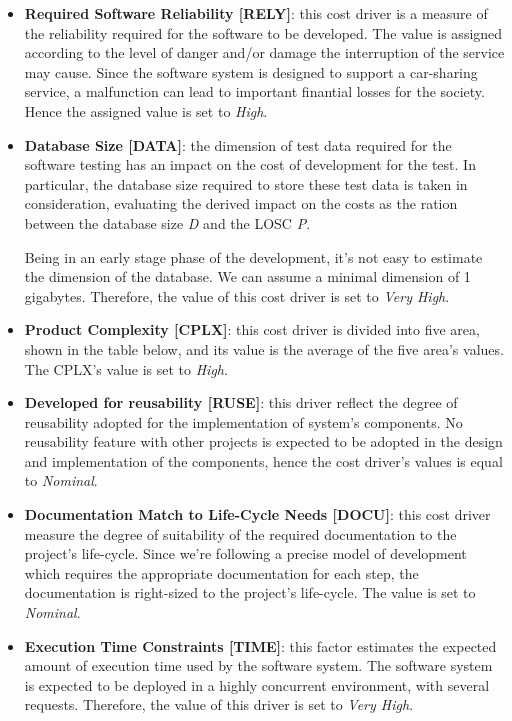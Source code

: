 \begin{itemize}
	\item \textbf{Required Software Reliability [RELY]}: this cost driver is a measure of the reliability required for the software to be developed. The value is assigned according to the level of danger and/or damage the interruption of the service may cause.
Since the software system is designed to support a car-sharing service, a malfunction can lead to important finantial losses for the society. Hence the assigned value is set to \textit{High}.

	\item \textbf{Database Size [DATA]}: the dimension of test data required for the software testing has an impact on the cost of development for the test. In particular, the database size required to store these test data is taken in consideration, evaluating the derived impact on the costs as the ration between the database size \textit{D} and the LOSC \textit{P}.

Being in an early stage phase of the development, it's not easy to estimate the dimension of the database. We can assume a minimal dimension of 1 gigabytes. Therefore, the value of this cost driver is set to \textit{Very High}.

	\item \textbf{Product Complexity [CPLX]}: this cost driver is divided into five area, shown in the table below, and its value is the average of the five area's values. %
The CPLX's value is set to \textit{High}.

	\item \textbf{Developed for reusability [RUSE]}: this driver reflect the degree of reusability adopted for the implementation of system's components.
No reusability feature with other projects is expected to be adopted in the design and implementation of the components, hence the cost driver's values is equal to \textit{Nominal}.

	\item \textbf{Documentation Match to Life-Cycle Needs [DOCU]}: this cost driver measure the degree of suitability of the required documentation to the project's life-cycle.
Since we're following a precise model of development which requires the appropriate documentation for each step, the documentation is right-sized to the project's life-cycle. The value is set to \textit{Nominal}.

	\item \textbf{Execution Time Constraints [TIME]}: this factor estimates the expected amount of execution time used by the software system.
The software system is expected to be deployed in a highly concurrent environment, with several requests. Therefore, the value of this driver is set to \textit{Very High}.


\end{itemize}
